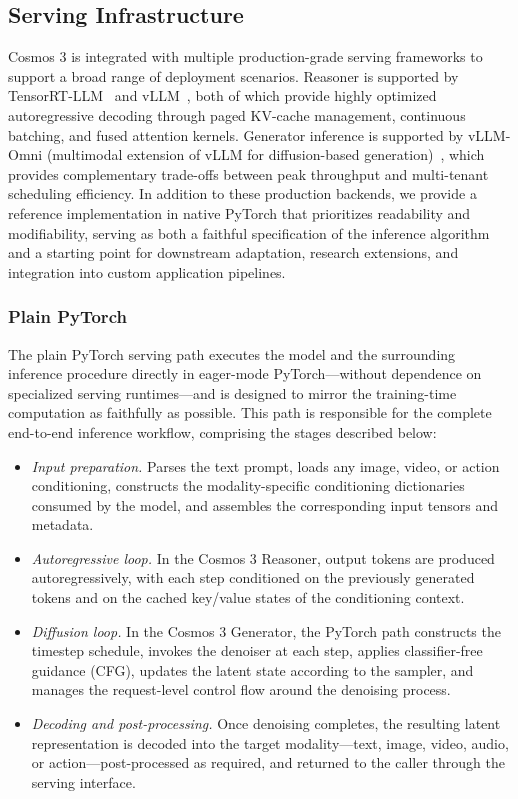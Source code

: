 \documentclass{llmxive}
\begin{document}
\subsection{Serving Infrastructure}
\label{subsec::serving_infrastructure}

Cosmos 3 is integrated with multiple production-grade serving frameworks to support a broad range of deployment scenarios. Reasoner is supported by TensorRT-LLM~\citep{trtllm} and vLLM~\citep{vllm}, both of which provide highly optimized autoregressive decoding through paged KV-cache management, continuous batching, and fused attention kernels. Generator inference is supported by vLLM-Omni (multimodal extension of vLLM for diffusion-based generation)~\citep{vllm_omni}, which provides complementary trade-offs between peak throughput and multi-tenant scheduling efficiency. In addition to these production backends, we provide a reference implementation in native PyTorch that prioritizes readability and modifiability, serving as both a faithful specification of the inference algorithm and a starting point for downstream adaptation, research extensions, and integration into custom application pipelines.

\subsubsection{Plain PyTorch}

The plain PyTorch serving path executes the model and the surrounding inference procedure directly in eager-mode PyTorch---without dependence on specialized serving runtimes---and is designed to mirror the training-time computation as faithfully as possible. This path is responsible for the complete end-to-end inference workflow, comprising the stages described below:

\begin{itemize}

\item \textit{Input preparation.} Parses the text prompt, loads any image, video, or action conditioning, constructs the modality-specific conditioning dictionaries consumed by the model, and assembles the corresponding input tensors and metadata.
\item \textit{Autoregressive loop.} In the Cosmos 3 Reasoner, output tokens are produced autoregressively, with each step conditioned on the previously generated tokens and on the cached key/value states of the conditioning context.
\item \textit{Diffusion loop.} In the Cosmos 3 Generator, the PyTorch path constructs the timestep schedule, invokes the denoiser at each step, applies classifier-free guidance (CFG), updates the latent state according to the sampler, and manages the request-level control flow around the denoising process.
\item \textit{Decoding and post-processing.} Once denoising completes, the resulting latent representation is decoded into the target modality---text, image, video, audio, or action---post-processed as required, and returned to the caller through the serving interface.

\end{itemize}
\end{document}
